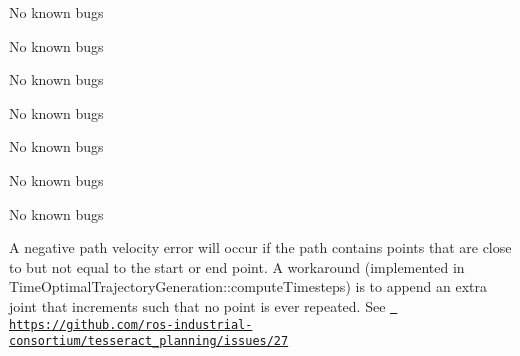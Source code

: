 \begin{DoxyRefList}
\label{bug__bug000224}%
%
No known bugs 
\item[File \mbox{\hyperlink{taskflow__profiling__example_8cpp}{taskflow\+\_\+profiling\+\_\+example.cpp}} ]\label{bug__bug000210}%
%
No known bugs 
\item[File \mbox{\hyperlink{taskflow__task__composer__executor_8h}{taskflow\+\_\+task\+\_\+composer\+\_\+executor.h}} ]\label{bug__bug000357}%
%
No known bugs 
\item[File \mbox{\hyperlink{taskflow__task__composer__future_8cpp}{taskflow\+\_\+task\+\_\+composer\+\_\+future.cpp}} ]\label{bug__bug000408}%
%
No known bugs 
\item[File \mbox{\hyperlink{taskflow__task__composer__future_8h}{taskflow\+\_\+task\+\_\+composer\+\_\+future.h}} ]\label{bug__bug000358}%
%
No known bugs 
\item[File \mbox{\hyperlink{taskflow__visualization__utils_8h}{taskflow\+\_\+visualization\+\_\+utils.h}} ]\label{bug__bug000259}%
%
No known bugs 
\item[File \mbox{\hyperlink{tesseract__common__trajectory_8cpp}{tesseract\+\_\+common\+\_\+trajectory.cpp}} ]\label{bug__bug000417}%
%
No known bugs 
\item[Member \mbox{\hyperlink{classtesseract__planning_1_1totg_1_1Trajectory_a78d9b62367b7178b2d23eaf185969319}{tesseract\+\_\+planning\+::totg\+::Trajectory\+::Trajectory}} (const \mbox{\hyperlink{classtesseract__planning_1_1totg_1_1Path}{Path}} \&path, const Eigen\+::\+Vector\+Xd \&max\+\_\+velocity, const Eigen\+::\+Vector\+Xd \&max\+\_\+acceleration, double time\+\_\+step=0.\+001)]\label{bug__bug000413}%
%
A negative path velocity error will occur if the path contains points that are close to but not equal to the start or end point. A workaround (implemented in Time\+Optimal\+Trajectory\+Generation\+::compute\+Timesteps) is to append an extra joint that increments such that no point is ever repeated. See \href{https://github.com/ros-industrial-consortium/tesseract_planning/issues/27}{\texttt{ https\+://github.\+com/ros-\/industrial-\/consortium/tesseract\+\_\+planning/issues/27}}  
\item[File \mbox{\hyperlink{tesseract__task__composer_2include_2tesseract__task__composer_2profiles_2time__optimal__parameterization__profile_8h}{time\+\_\+optimal\+\_\+parameterization\+\_\+profile.h}} ]\label{bug__bug000343}%

\end{DoxyRefList}
